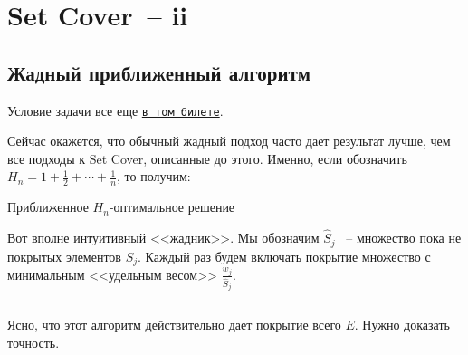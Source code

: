 \section{Set Cover~-- ii}

\secauthor{\denis}
\subsection{Жадный приближенный алгоритм}
Условие задачи все еще \hyperlink{setcover}{\texttt{в том билете}}.

Сейчас окажется, что обычный жадный подход часто дает результат лучше, чем все подходы к Set Cover, описанные до этого. Именно, если обозначить $H_n = 1 + \frac{1}{2} + \cdots + \frac{1}{n}$, то получим:

\begin{algodescription}{Приближенное $H_n$-оптимальное решение}

Вот вполне интуитивный <<жадник>>. Мы обозначим $\hat{S}_j$ ~-- множество пока не покрытых элементов $S_j$. Каждый раз будем включать покрытие множество с минимальным <<удельным весом>> $\frac{w_j}{\hat{S}_j}$.

\begin{algorithm}[H]
	\DontPrintSemicolon
\end{algorithm}
$ $
\end{algodescription}

Ясно, что этот алгоритм действительно дает покрытие всего $E$. Нужно доказать точность.

